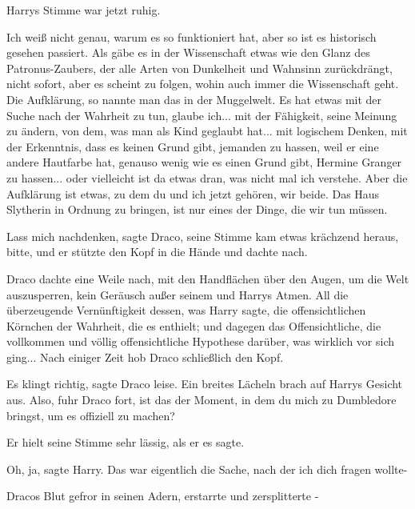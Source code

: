 Harrys Stimme war jetzt ruhig.

\glqq Ich weiß nicht genau, warum es so funktioniert hat, aber so ist es
historisch gesehen passiert. Als gäbe es in der Wissenschaft etwas wie den Glanz
des Patronus-Zaubers, der alle Arten von Dunkelheit und Wahnsinn zurückdrängt,
nicht sofort, aber es scheint zu folgen, wohin auch immer die Wissenschaft geht.
Die Aufklärung, so nannte man das in der Muggelwelt. Es hat etwas mit der Suche
nach der Wahrheit zu tun, glaube ich... mit der Fähigkeit, seine Meinung zu
ändern, von dem, was man als Kind geglaubt hat... mit logischem Denken, mit der
Erkenntnis, dass es keinen Grund gibt, jemanden zu hassen, weil er eine andere
Hautfarbe hat, genauso wenig wie es einen Grund gibt, Hermine Granger zu
hassen... oder vielleicht ist da etwas dran, was nicht mal ich verstehe. Aber
die Aufklärung ist etwas, zu dem du und ich jetzt gehören, wir beide. Das Haus
Slytherin in Ordnung zu bringen, ist nur eines der Dinge, die wir tun
müssen.\grqq{}

\glqq Lass mich nachdenken\grqq{}, sagte Draco, seine Stimme kam etwas krächzend
heraus, \glqq bitte\grqq{}, und er stützte den Kopf in die Hände und dachte
nach.

Draco dachte eine Weile nach, mit den Handflächen über den Augen, um die Welt
auszusperren, kein Geräusch außer seinem und Harrys Atmen. All die überzeugende
Vernünftigkeit dessen, was Harry sagte, die offensichtlichen Körnchen der
Wahrheit, die es enthielt; und dagegen das Offensichtliche, die vollkommen und
völlig offensichtliche Hypothese darüber, was wirklich vor sich ging... Nach
einiger Zeit hob Draco schließlich den Kopf.

\glqq Es klingt richtig\grqq{}, sagte Draco leise. Ein breites Lächeln brach auf
Harrys Gesicht aus. \glqq Also\grqq{}, fuhr Draco fort, \glqq ist das der
Moment, in dem du mich zu Dumbledore bringst, um es offiziell zu machen?\grqq{}

Er hielt seine Stimme sehr lässig, als er es sagte.

\glqq Oh, ja\grqq{}, sagte Harry. \glqq Das war eigentlich die Sache, nach der
ich dich fragen wollte-\grqq{}

Dracos Blut gefror in seinen Adern, erstarrte und zersplitterte -

